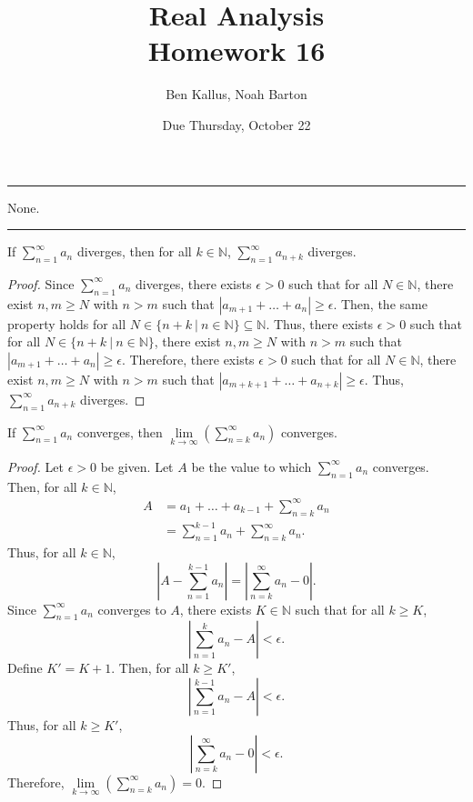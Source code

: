\documentclass[12pt]{article}
\title{Real Analysis \\ Homework 16}
\author{Ben Kallus, Noah Barton}
\date{Due Thursday, October 22}
\begin{document}
\pagecolor{black}
\color{white}
\maketitle

\hrule
\bigskip

 None.

\bigskip
\hrule
\bigskip

 If $\sum\limits_{n=1}^\infty a_n$ diverges, then for all $k \in \mathbb N$, $\sum\limits_{n=1}^\infty a_{n+k}$ diverges.
\begin{proof}
    Since $\sum\limits_{n=1}^\infty a_n$ diverges, there exists $\epsilon > 0$ such that for all $N \in \mathbb N$, there exist $n,m \geq N$ with $n > m$ such that $|a_{m+1} + \hdots + a_n| \geq \epsilon$. Then, the same property holds for all $N \in \{n+k~|~n \in \mathbb N\} \subseteq \mathbb N$. Thus, there exists $\epsilon > 0$ such that for all $N \in \{n+k~|~n \in \mathbb N\}$, there exist $n,m \geq N$ with $n > m$ such that $|a_{m+1} + \hdots + a_n| \geq \epsilon$. Therefore, there exists $\epsilon > 0$ such that for all $N \in \mathbb N$, there exist $n,m \geq N$ with $n > m$ such that $|a_{m+k+1} + \hdots + a_{n+k}| \geq \epsilon$. Thus, $\sum\limits_{n=1}^\infty a_{n+k}$ diverges.
\end{proof}

\newpage
{} If $\sum\limits_{n=1}^\infty a_n$ converges, then $\lim\limits_{k\to\infty} \left( \sum\limits_{n=k}^\infty a_n \right)$ converges.
\begin{proof}
    Let $\epsilon > 0$ be given. Let $A$ be the value to which $\sum\limits_{n=1}^\infty a_n$ converges. Then, for all $k \in \mathbb N$,
    \begin{align*}
        A &= a_1 + \hdots + a_{k-1} + \sum\limits_{n=k}^\infty a_n \\
          &= \sum\limits_{n=1}^{k-1} a_n + \sum\limits_{n=k}^\infty a_n.
    \end{align*}
    Thus, for all $k \in \mathbb N$, $$\left|A - \sum\limits_{n=1}^{k-1} a_n\right| = \left|\sum\limits_{n=k}^\infty a_n - 0\right|.$$ Since $\sum\limits_{n=1}^\infty a_n$ converges to $A$, there exists $K \in \mathbb N$ such that for all $k \geq K$, $$\left| \sum_{n=1}^k a_n - A\right| < \epsilon.$$
    Define $K' = K + 1$. Then, for all $k \geq K'$, $$\left| \sum_{n=1}^{k-1} a_n - A\right| < \epsilon.$$
    Thus, for all $k \geq K'$, $$\left|\sum\limits_{n=k}^\infty a_n - 0\right| < \epsilon.$$
    Therefore, $\lim\limits_{k\to\infty} \left( \sum\limits_{n=k}^\infty a_n \right) = 0$.
\end{proof}
    
\end{document}
